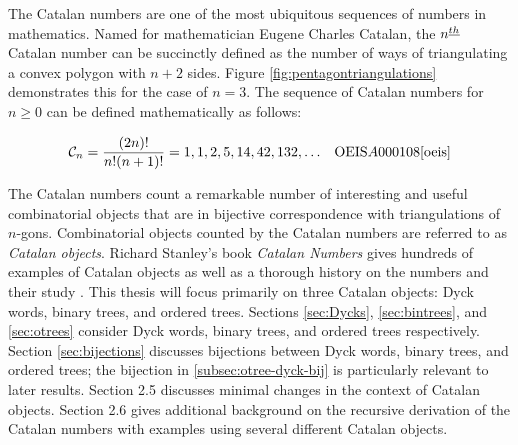 The Catalan numbers are one of the most ubiquitous sequences of numbers in mathematics.  
Named for mathematician Eugene Charles Catalan, the $n^{\underline{th}}$ Catalan number can be succinctly defined as the number of ways of triangulating a convex polygon with $n+2$ sides.  Figure \ref{fig:pentagontriangulations} demonstrates this for the case of $n=3$. The sequence of Catalan numbers for $n \ge 0$ can be defined mathematically as follows:

\begin{align}
    \mathcal{C}_n &= \frac{(2n)!}{n!(n+1)!} =1, 1, 2, 5, 14, 42, 132, \ldots & \text{OEIS} A000108 \cite{oeis}
\end{align}



The Catalan numbers count a remarkable number of interesting and useful combinatorial objects that are in bijective correspondence with triangulations of $n$-gons. Combinatorial objects counted by the Catalan numbers are referred to as \emph{Catalan objects}.   Richard Stanley's book \emph{Catalan Numbers} gives hundreds of examples of Catalan objects  as well as a thorough history on the numbers and their study \cite{stanley2015Catalan}. This thesis will focus primarily on three Catalan objects: Dyck words, binary trees, and ordered trees. Sections \ref{sec:Dycks}, \ref{sec:bintrees}, and \ref{sec:otrees} consider Dyck words, binary trees, and ordered trees respectively.  Section \ref{sec:bijections} discusses bijections between Dyck words, binary trees, and ordered trees; the bijection in \ref{subsec:otree-dyck-bij} is particularly relevant to later results.  Section 2.5 discusses minimal changes in the context of Catalan objects. Section 2.6 gives additional background on the recursive derivation of the Catalan numbers with examples using several different Catalan objects.


